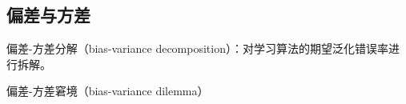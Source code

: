 \documentclass[../studies-ml.tex]{subfiles}
\begin{document}








\setcounter{subsection}{4}
\subsection{偏差与方差}

偏差-方差分解（bias-variance decomposition）：对学习算法的期望泛化错误率进行拆解。

偏差-方差窘境（bias-variance dilemma）
\end{document}
